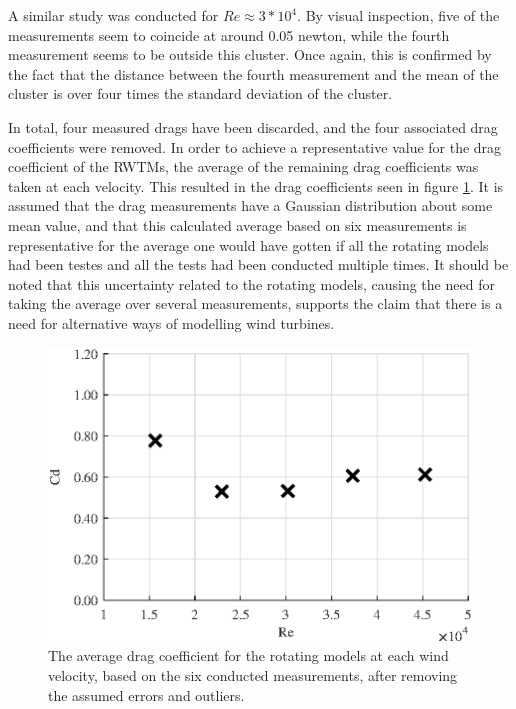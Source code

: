 A similar study was conducted for $Re \approx 3*10^4$. By visual inspection, five of the measurements seem to coincide at around 0.05 \si{newton}, while the fourth measurement seems to be outside this cluster. Once again, this is confirmed by the fact that the distance between the fourth measurement and the mean of the cluster is over four times the standard deviation of the cluster. 


In total, four measured drags have been discarded, and the four associated drag coefficients were removed. In order to achieve a representative value for the drag coefficient of the \gls{RWTM}s, the average of the remaining drag coefficients was taken at each velocity. This resulted in the drag coefficients seen in figure \ref{fig:RotationalAvg}. It is assumed that the drag measurements have a Gaussian distribution about some mean value, and that this calculated average based on six measurements is representative for the average one would have gotten if all the rotating models had been testes and all the tests had been conducted multiple times. It should be noted that this uncertainty related to the rotating models, causing the need for taking the average over several measurements, supports the claim that there is a need for alternative ways of modelling wind turbines. 





\begin{figure}[h!]
    \centering
    \includegraphics[width=0.8\linewidth]{0_Images/RotationalAverageRe.eps}
    \caption{The average drag coefficient for the rotating models at each wind velocity, based on the six conducted measurements, after removing the assumed errors and outliers.}
    \label{fig:RotationalAvg}
\end{figure}


